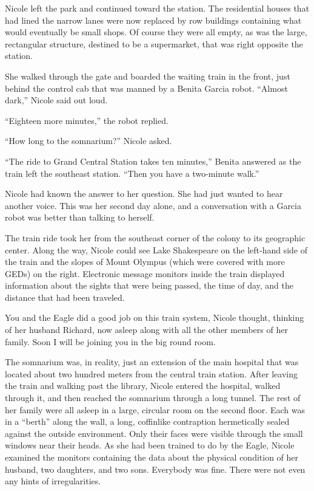 \documentclass[]{article}
\begin{document}
{Nicole left the park and continued toward the station.  The residential houses that had lined the narrow lanes were now replaced by row buildings containing what would eventually be small shops.  Of course they were all empty, as was the large, rectangular structure, destined to be a supermarket, that was right opposite the station.

She walked through the gate and boarded the waiting train in the front, just behind the control cab that was manned by a Benita Garcia robot.  “Almost dark,” Nicole said out loud.

“Eighteen more minutes,” the robot replied.

“How long to the somnarium?” Nicole asked.

“The ride to Grand Central Station takes ten minutes,” Benita answered as the train left the southeast station.  “Then you have a two-minute walk.”

Nicole had known the answer to her question.  She had just wanted to hear another voice.  This was her second day alone, and a conversation with a Garcia robot was better than talking to herself.

The train ride took her from the southeast corner of the colony to its geographic center.  Along the way, Nicole could see Lake Shakespeare on the left-hand side of the train and the slopes of Mount Olympus (which were covered with more GEDs) on the right.  Electronic message monitors inside the train displayed information about the sights that were being passed, the time of day, and the distance that had been traveled.

You and the Eagle did a good job on this train system, Nicole thought, thinking of her husband Richard, now asleep along with all the other members of her family.  Soon I will be joining you in the big round room.

The somnarium was, in reality, just an extension of the main hospital that was located about two hundred meters from the central train station.  After leaving the train and walking past the library, Nicole entered the hospital, walked through it, and then reached the somnarium through a long tunnel.  The rest of her family were all asleep in a large, circular room on the second floor.  Each was in a “berth” along the wall, a long, coffinlike contraption hermetically sealed against the outside environment.  Only their faces were visible through the small windows near their heads.  As she had been trained to do by the Eagle, Nicole examined the monitors containing the data about the physical condition of her husband, two daughters, and two sons.  Everybody was fine.  There were not even any hints of irregularities.

}
\end{document}
